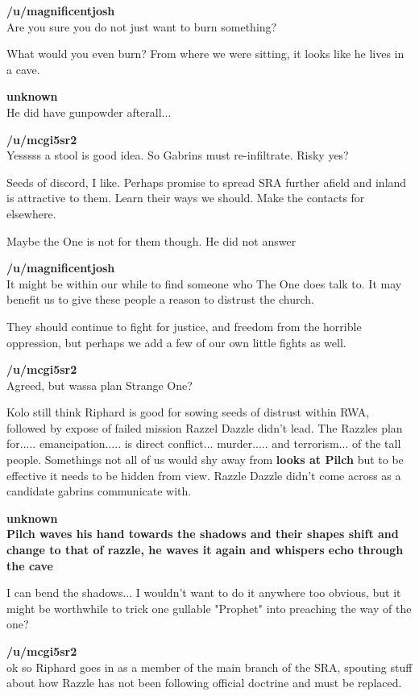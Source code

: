 \textbf{/u/magnificentjosh}\\
Are you sure you do not just want to burn something?\medskip

What would you even burn? From where we were sitting, it looks like he lives in a cave.\medskip

\textbf{unknown}\\
He did have gunpowder afterall...\medskip

\textbf{/u/mcgi5sr2}\\
Yesssss a stool is good idea. So Gabrins must re-infiltrate. Risky yes?\medskip

Seeds of discord, I like. Perhaps promise to spread SRA further afield and inland is attractive to them. Learn their ways we should. Make the contacts for elsewhere.\medskip

Maybe the One is not for them though. He did not answer\medskip

\textbf{/u/magnificentjosh}\\
It might be within our while to find someone who The One does talk to. It may benefit us to give these people a reason to distrust the church.\medskip

They should continue to fight for justice, and freedom from the horrible oppression, but perhaps we add a few of our own little fights as well.\medskip

\textbf{/u/mcgi5sr2}\\
Agreed, but wassa plan Strange One?\medskip

Kolo still think Riphard is good for sowing seeds of distrust within RWA, followed by expose of failed mission Razzel Dazzle didn't lead. The Razzles plan for..... emancipation..... is direct conflict... murder..... and terrorism... of the tall people. Somethings not all of us would shy away from \textbf{looks at Pilch} but to be effective it needs to be hidden from view. Razzle Dazzle didn't come across as a candidate gabrins communicate with.\medskip

\textbf{unknown}\\
\textbf{Pilch waves his hand towards the shadows and their shapes shift and change to that of razzle, he waves it again and whispers echo through the cave}\medskip

I can bend the shadows... I wouldn't want to do it anywhere too obvious, but it might be worthwhile to trick one gullable "Prophet" into preaching the way of the one?\medskip

\textbf{/u/mcgi5sr2}\\
ok so Riphard goes in as a member of the main branch of the SRA, spouting stuff about how Razzle has not been following official doctrine and must be replaced.\medskip

